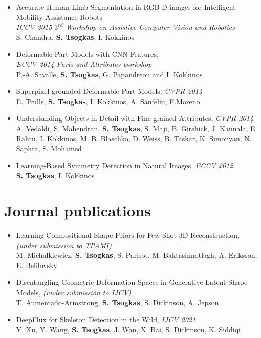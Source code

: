 \documentclass[margin]{res}
\begin{document}
\begin{resume}
\begin{itemize}
		\item   Accurate Human-Limb Segmentation in RGB-D images for Intelligent Mobility Assistance Robots\\
			\emph{ICCV 2015 $3^{rd}$ Workshop on Assistive Computer Vision and Robotics}\\
			S. Chandra, \textbf{S. Tsogkas}, I. Kokkinos
		\item  Deformable Part Models with CNN Features,\\ \emph{ECCV 2014 Parts and Attributes workshop}\\
		P.-A. Savalle, \textbf{S. Tsogkas}, G. Papandreou and I. Kokkinos 
		\item  Superpixel-grounded Deformable Part Models, \emph{CVPR 2014}\\
			E. Trulls, \textbf{S. Tsogkas}, I. Kokkinos, A. Sanfeliu, F.Moreno
		\item Understanding Objects in Detail with Fine-grained Attributes, \emph{CVPR 2014} \\
		A. Vedaldi, S. Mahendran, \textbf{S. Tsogkas}, S. Maji, B. Girshick, J. Kannala, E. Rahtu, I. Kokkinos, M. B. Blaschko, D. Weiss, B. Taskar, K. Simonyan, N. Saphra, S. Mohamed 
		\item Learning-Based Symmetry Detection in Natural Images, \emph{ECCV 2012} \\
			\textbf{S. Tsogkas}, I. Kokkinos
	\end{itemize}

\section{Journal publications} 
	\begin{itemize}
		\item Learning Compositional Shape Priors for Few-Shot 3D Reconstruction, \emph{(under submission to TPAMI)} \\
			M. Michalkiewicz, \textbf{S. Tsogkas}, S. Parisot, M. Baktashmotlagh, 
			A. Eriksson, E. Belilovsky
		\item Disentangling Geometric Deformation Spaces in Generative Latent Shape Models, \emph{(under submission to IJCV)} \\
			T. Aumentado-Armstrong, \textbf{S. Tsogkas}, S. Dickinson, A. Jepson
		\item DeepFlux for Skeleton Detection in the Wild, \emph{IJCV 2021}\\
			Y. Xu, Y. Wang, \textbf{S. Tsogkas}, J. Wan, X. Bai, S. Dickinson, K. Siddiqi
	\end{itemize}



\end{resume}
\end{document}
